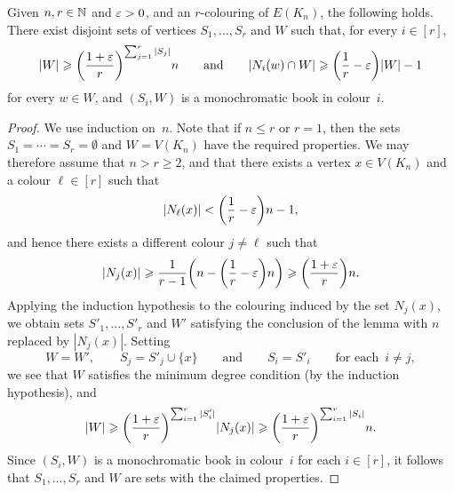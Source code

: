 \begin{lemma}
  \label{lem:ESz:steps} %
  Given\/ $n,r \in \mathbb{N}$ and\/ $\varepsilon > 0$, and an $r$-colouring of $E(K_n)$, the following holds. There exist disjoint sets of vertices\/ $S_1,\dots,S_r$ and\/ $W$ such that, for every $i \in [r]$, 
  $$|W| \geqslant \bigg( \frac{1+\varepsilon}{r} \bigg)^{\sum_{j = 1}^r |S_j|} n \qquad \text{and} \qquad |N_i(w) \cap W| \geqslant \bigg( \frac{1}{r} - \varepsilon \bigg) |W| - 1$$ 
  for every $w \in W$, and $(S_i,W)$ is a monochromatic book in colour~$i$.
\end{lemma}
%
\begin{proof}
  We use induction on~$n$. Note that if $n \le r$ or $r = 1$, then the sets $S_1 = \cdots = S_r = \emptyset$ and $W = V(K_n)$ have the required properties. We may therefore assume that $n > r \ge 2$, and that there exists a vertex $x \in V(K_n)$ and a colour $\ell \in [r]$ such that
  $$|N_\ell(x)| < \bigg( \frac{1}{r} - \varepsilon \bigg) n - 1,$$
  and hence there exists a different colour $j \ne \ell$ such that 
  $$|N_j(x)| \geqslant \frac{1}{r-1} \bigg( n - \bigg( \frac{1}{r} - \varepsilon \bigg) n \bigg) \geqslant \bigg( \frac{1 + \varepsilon}{r} \bigg) n.$$
  Applying the induction hypothesis to the colouring induced by the set $N_j(x)$, we obtain sets $S'_1,\ldots,S'_r$ and $W'$ satisfying the conclusion of the lemma with $n$ replaced by $|N_j(x)|$. Setting 
  $$W = W', \qquad S_j = S'_j \cup \{x\} \qquad \text{and} \qquad S_i = S'_i \qquad \text{for each } \, i \ne j,$$ 
  we see that $W$ satisfies the minimum degree condition (by the induction hypothesis), and
  $$|W| \geqslant \bigg( \frac{1+\varepsilon}{r} \bigg)^{\sum_{i = 1}^r |S'_i|}|N_j(x)| \geqslant \bigg( \frac{1+\varepsilon}{r} \bigg)^{\sum_{i=1}^r |S_i|}n.$$
  Since $(S_i,W)$ is a monochromatic book in colour~$i$ for each $i \in [r]$, it follows that $S_1,\dots,S_r$ and $W$ are sets with the claimed properties.
\end{proof}


